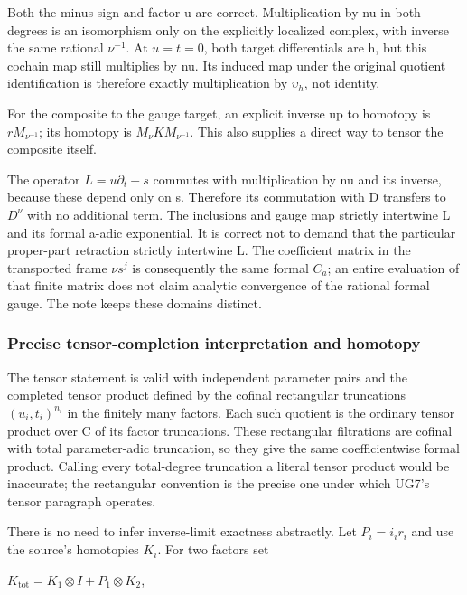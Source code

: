 Both the minus sign and factor u are correct. Multiplication by nu in both degrees is an isomorphism only on the explicitly localized complex, with inverse the same rational \(\nu^{-1}\). At \(u=t=0\), both target differentials are h, but this cochain map still multiplies by nu. Its induced map under the original quotient identification is therefore exactly multiplication by \(\upsilon_h\), not identity.

For the composite to the gauge target, an explicit inverse up to homotopy is \(r M_{\nu^{-1}}\); its homotopy is \(M_\nu K M_{\nu^{-1}}\). This also supplies a direct way to tensor the composite itself.

The operator \(L=u\partial_t-s\) commutes with multiplication by nu and its inverse, because these depend only on s. Therefore its commutation with D transfers to \(D^\nu\) with no additional term. The inclusions and gauge map strictly intertwine L and its formal a-adic exponential. It is correct not to demand that the particular proper-part retraction strictly intertwine L. The coefficient matrix in the transported frame \(\nu s^j\) is consequently the same formal \(C_a\); an entire evaluation of that finite matrix does not claim analytic convergence of the rational formal gauge. The note keeps these domains distinct.

\subsubsection{Precise tensor-completion interpretation and homotopy}\label{endpoint-f1_unit_gauge_review--precise-tensor-completion-interpretation-and-homotopy}

The tensor statement is valid with independent parameter pairs and the completed tensor product defined by the cofinal rectangular truncations \((u_i,t_i)^{n_i}\) in the finitely many factors. Each such quotient is the ordinary tensor product over C of its factor truncations. These rectangular filtrations are cofinal with total parameter-adic truncation, so they give the same coefficientwise formal product. Calling every total-degree truncation a literal tensor product would be inaccurate; the rectangular convention is the precise one under which UG7's tensor paragraph operates.

There is no need to infer inverse-limit exactness abstractly. Let \(P_i=i_i r_i\) and use the source's homotopies \(K_i\). For two factors set

\(K_{\mathrm{tot}}=K_1\otimes I+P_1\otimes K_2\),


